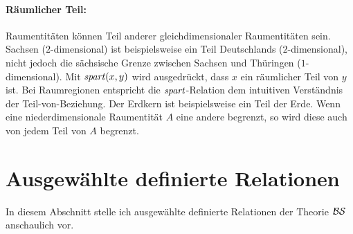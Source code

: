 \paragraph{Räumlicher Teil:}
       Raumentitäten
       können Teil anderer gleichdimensionaler Raumentitäten sein.
       Sachsen ($2$-dimensional) ist beispielsweise ein Teil Deutschlands ($2$-dimensional), nicht jedoch die sächsische Grenze zwischen Sachsen und Thüringen ($1$-dimensional).
       Mit $\mathit{spart}(x,y)$ wird ausgedrückt, dass $x$ ein räumlicher Teil von $y$ ist.
       Bei Raumregionen entspricht die $\mathit{spart}$-Relation dem intuitiven Verständnis der Teil-von-Beziehung. 
       Der Erdkern ist beispielsweise ein Teil der Erde.
       Wenn eine niederdimensionale Raumentität $A$ eine andere begrenzt, so wird diese auch von jedem Teil von $A$ begrenzt.
       


\section{Ausgewählte definierte Relationen}
In diesem Abschnitt stelle ich ausgewählte definierte Relationen der Theorie $\mathcal{BS}$ anschaulich vor. 
    
